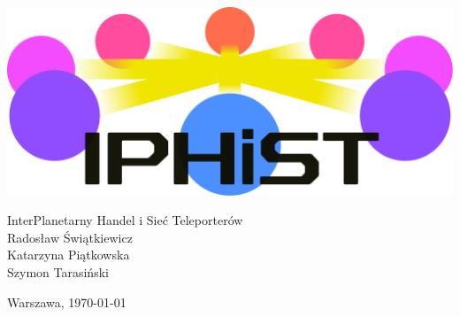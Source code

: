 \begin{titlepage}
\pagestyle{empty}

\vfill
\begin{center}
\includegraphics[width=\textwidth]{img/logo.pdf}
\end{center}

\begin{center}
\Large
InterPlanetarny Handel i Sieć Teleporterów \\
\large
Radosław Świątkiewicz\\
Katarzyna Piątkowska\\
Szymon Tarasiński
\end{center}


\vfill
\begin{center}
Warszawa, \today
\end{center}

\end{titlepage} 
